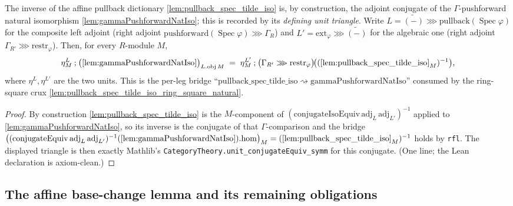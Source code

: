 \begin{lemma}



  \label{lem:pullback_spec_tilde_iso_inv_unit_triangle}
  The inverse of the affine pullback dictionary \cref{lem:pullback_spec_tilde_iso} is, by
  construction, the adjoint conjugate of the \(\Gamma\)-pushforward natural isomorphism
  \cref{lem:gammaPushforwardNatIso}; this is recorded by its \emph{defining unit triangle}.
  Write \(L = \widetilde{(-)} \ggg \mathrm{pullback}(\operatorname{Spec}\varphi)\) for the
  composite left adjoint (right adjoint \(\mathrm{pushforward}(\operatorname{Spec}\varphi)\ggg
  \Gamma_R\)) and \(L' = \mathrm{ext}_\varphi \ggg \widetilde{(-)}\) for the algebraic one
  (right adjoint \(\Gamma_{R'}\ggg\mathrm{restr}_\varphi\)). Then, for every \(R\)-module \(M\),
  \[
    \eta^{L}_M \mathbin{;} \bigl(\text{\cref{lem:gammaPushforwardNatIso}}\bigr)_{L.\mathrm{obj}\,M}
      \;=\;
    \eta^{L'}_M \mathbin{;} \bigl(\Gamma_{R'}\ggg\mathrm{restr}_\varphi\bigr)
              \!\bigl((\text{\cref{lem:pullback_spec_tilde_iso}}_M)^{-1}\bigr),
  \]
  where \(\eta^{L}, \eta^{L'}\) are the two units. This is the per-leg bridge
  ``\(\mathrm{pullback\_spec\_tilde\_iso}\rightsquigarrow\mathrm{gammaPushforwardNatIso}\)''
  consumed by the ring-square crux \cref{lem:pullback_spec_tilde_iso_ring_square_natural}.
  \begin{proof}
    By construction \cref{lem:pullback_spec_tilde_iso} is the \(M\)-component of
    \((\mathrm{conjugateIsoEquiv}\,\mathrm{adj}_L\,\mathrm{adj}_{L'})^{-1}\) applied to
    \cref{lem:gammaPushforwardNatIso}, so its inverse is the conjugate of that
    \(\Gamma\)-comparison and the bridge
    \(\bigl((\mathrm{conjugateEquiv}\,\mathrm{adj}_L\,\mathrm{adj}_{L'})^{-1}
    (\text{\cref{lem:gammaPushforwardNatIso}}).\mathrm{hom}\bigr)_M
    = (\text{\cref{lem:pullback_spec_tilde_iso}}_M)^{-1}\) holds by \texttt{rfl}. The displayed
    triangle is then exactly Mathlib's \texttt{CategoryTheory.unit\_conjugateEquiv\_symm} for this
    conjugate. (One line; the Lean declaration is axiom-clean.)
  \end{proof}
\end{lemma}

\subsection{The affine base-change lemma and its remaining obligations}

